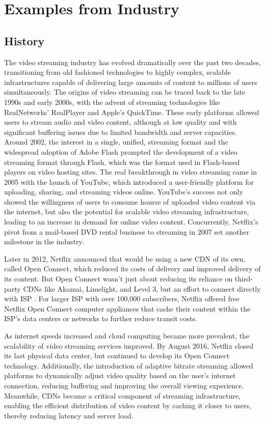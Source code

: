 \chapter{Examples from Industry}\label{chapter:examples}

\section{History}
The video streaming industry has evolved dramatically over the past two decades, transitioning from old fashioned technologies to highly complex, scalable infrastructures capable of delivering large amounts of content to millions of users simultaneously. The origins of video streaming can be traced back to the late 1990s and early 2000s, with the advent of streaming technologies like RealNetworks' RealPlayer and Apple's QuickTime. These early platforms allowed users to stream audio and video content, although at low quality and with significant buffering issues due to limited bandwidth and server capacities.
Around 2002, the interest in a single, unified, streaming format and the widespread adoption of Adobe Flash prompted the development of a video streaming format through Flash, which was the format used in Flash-based players on video hosting sites.
The real breakthrough in video streaming came in 2005 with the launch of YouTube, which introduced a user-friendly platform for uploading, sharing, and streaming videos online. YouTube's success not only showed the willingness of users to consume hourse of uploaded video content via the internet, but also the potential for scalable video streaming infrastructure, leading to an increase in demand for online video content. Concurrently, Netflix's pivot from a mail-based DVD rental business to streaming in 2007 set another milestone in the industry. 

Later in 2012, Netflix announced that would be using a new \ac{CDN} of its own, called Open Connect, which reduced its costs of delivery and improved delivery of its content. But Open Connect wasn’t just about reducing its reliance on third-party \ac{CDN}s like Akamai, Limelight, and Level 3, but an effort to connect directly with \ac{ISP} \cite{netflix_history}.
For larger \ac{ISP} with over 100,000 subscribers, Netflix offered free Netflix Open Connect computer appliances that cache their content within the \ac{ISP}'s data centers or networks to further reduce transit costs. 

As internet speeds increased and cloud computing became more prevalent, the scalability of video streaming services improved. By August 2016, Netflix closed its last physical data center, but continued to develop its Open Connect technology.
Additionally, the introduction of adaptive bitrate streaming allowed platforms to dynamically adjust video quality based on the user's internet connection, reducing buffering and improving the overall viewing experience\cite{ABR}. Meanwhile, \ac{CDN}s became a critical component of streaming infrastructure, enabling the efficient distribution of video content by caching it closer to users, thereby reducing latency and server load\cite{CDN}.

